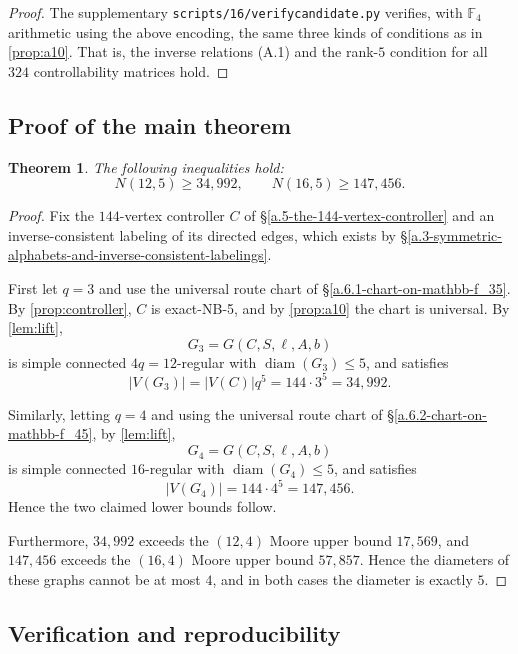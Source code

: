 \documentclass[11pt]{article}
\newtheorem{theorem}{Theorem}[section]
\theoremstyle{definition}
\theoremstyle{remark}
\renewcommand{\_}{\textunderscore\allowbreak}
\begin{document}
\begin{proof}
The supplementary
\texttt{scripts/16\_5\_147456/verify\_candidate.py} verifies, with
\(\mathbb F_4\) arithmetic using the above encoding, the same three
kinds of conditions as in \cref{prop:a10}. That is, the inverse
relations (A.1) and the rank-\(5\) condition for all \(324\)
controllability matrices hold.
\end{proof}

\subsection{Proof of the main
theorem}\label{a.7-proof-of-the-main-theorem}

\begin{theorem}\label{thm:bounds}
The following inequalities hold: \[
  N(12,5)\ge34{,}992,
  \qquad
  N(16,5)\ge147{,}456 .
\]
\end{theorem}

\begin{proof}
Fix the \(144\)-vertex controller \(C\) of \S\ref{a.5-the-144-vertex-controller} and an
inverse-consistent labeling of its directed edges, which exists by
\S\ref{a.3-symmetric-alphabets-and-inverse-consistent-labelings}.

First let \(q=3\) and use the universal route chart of \S\ref{a.6.1-chart-on-mathbb-f_35}. By
\cref{prop:controller}, \(C\) is exact-NB-5, and by \cref{prop:a10} the chart
is universal. By \cref{lem:lift}, \[
  G_3=G(C,S,\ell,A,b)
\] is simple connected \(4q=12\)-regular with \(\operatorname{diam}(G_3)\le5\),
and satisfies \[
  |V(G_3)|=|V(C)|q^5=144\cdot3^5=34{,}992 .
\]

Similarly, letting \(q=4\) and using the universal route chart of
\S\ref{a.6.2-chart-on-mathbb-f_45}, by \cref{lem:lift}, \[
  G_4=G(C,S,\ell,A,b)
\] is simple connected \(16\)-regular with \(\operatorname{diam}(G_4)\le5\), and
satisfies \[
  |V(G_4)|=144\cdot4^5=147{,}456 .
\] Hence the two claimed lower bounds follow.

Furthermore, \(34{,}992\) exceeds the \((12,4)\) Moore upper bound
\(17{,}569\), and \(147{,}456\) exceeds the \((16,4)\) Moore upper bound
\(57{,}857\). Hence the diameters of these graphs cannot be at most
\(4\), and in both cases the diameter is exactly \(5\).
\end{proof}

\subsection{Verification and
reproducibility}\label{a.8-verification-and-reproducibility}
\end{document}
